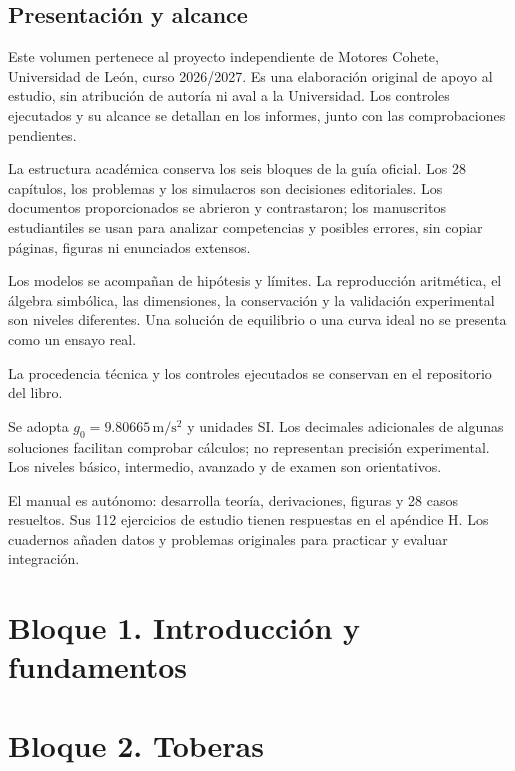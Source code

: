 
\renewcommand{\studiumvolumetype}{manual}

\frontmatter
\studiumreadingguide
\chapter*{Presentación y alcance}
Este volumen pertenece al proyecto independiente de Motores Cohete, Universidad de León, curso 2026/2027. Es una elaboración original de apoyo al estudio, sin atribución de autoría ni aval a la Universidad. Los controles ejecutados y su alcance se detallan en los informes, junto con las comprobaciones pendientes.

La estructura académica conserva los seis bloques de la guía oficial. Los 28 capítulos, los problemas y los simulacros son decisiones editoriales. Los documentos proporcionados se abrieron y contrastaron; los manuscritos estudiantiles se usan para analizar competencias y posibles errores, sin copiar páginas, figuras ni enunciados extensos.

Los modelos se acompañan de hipótesis y límites. La reproducción aritmética, el álgebra simbólica, las dimensiones, la conservación y la validación experimental son niveles diferentes. Una solución de equilibrio o una curva ideal no se presenta como un ensayo real.

La procedencia técnica y los controles ejecutados se conservan en el repositorio del libro.

Se adopta $g_0=9.80665\,\mathrm{m/s^2}$ y unidades SI. Los decimales adicionales de algunas soluciones facilitan comprobar cálculos; no representan precisión experimental. Los niveles básico, intermedio, avanzado y de examen son orientativos.

El manual es autónomo: desarrolla teoría, derivaciones, figuras y 28 casos resueltos. Sus 112 ejercicios de estudio tienen respuestas en el apéndice H. Los cuadernos añaden datos y problemas originales para practicar y evaluar integración.
\tableofcontents
\listoffigures
\mainmatter
\part{Bloque 1. Introducción y fundamentos}




\part{Bloque 2. Toberas}





